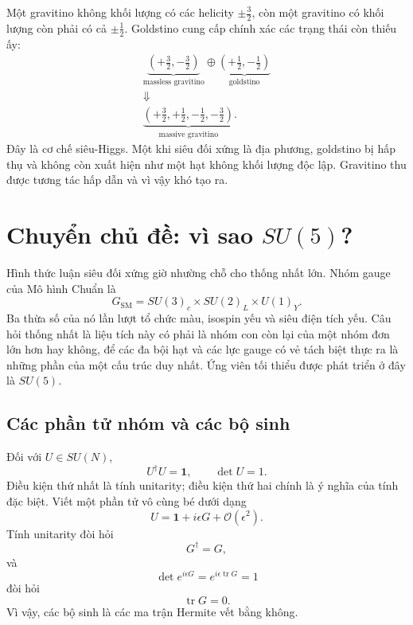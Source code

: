 Một gravitino không khối lượng có các helicity \(\pm\tfrac32\), còn một gravitino có khối lượng còn phải có cả \(\pm\tfrac12\). Goldstino cung cấp chính xác các trạng thái còn thiếu ấy:
\begin{equation}
\begin{gathered}
\underbrace{\left(+\frac32,-\frac32\right)}_{\text{massless gravitino}}
\oplus
\underbrace{\left(+\frac12,-\frac12\right)}_{\text{goldstino}}\\
\Downarrow\\
\underbrace{\left(+\frac32,+\frac12,-\frac12,-\frac32\right)}_{\text{massive gravitino}}.
\end{gathered}
\label{eq:l9-super-higgs}
\end{equation}
Đây là cơ chế siêu-Higgs. Một khi siêu đối xứng là địa phương, goldstino bị hấp thụ và không còn xuất hiện như một hạt không khối lượng độc lập. Gravitino thu được tương tác hấp dẫn và vì vậy khó tạo ra.

\section{Chuyển chủ đề: vì sao \texorpdfstring{\(SU(5)\)}{SU(5)}?}

Hình thức luận siêu đối xứng giờ nhường chỗ cho thống nhất lớn. Nhóm gauge của Mô hình Chuẩn là
\begin{equation}
G_{\mathrm{SM}}
=SU(3)_c\times SU(2)_L\times U(1)_Y.
\label{eq:l9-sm-group}
\end{equation}
Ba thừa số của nó lần lượt tổ chức màu, isospin yếu và siêu điện tích yếu. Câu hỏi thống nhất là liệu tích này có phải là nhóm con còn lại của một nhóm đơn lớn hơn hay không, để các đa bội hạt và các lực gauge có vẻ tách biệt thực ra là những phần của một cấu trúc duy nhất. Ứng viên tối thiểu được phát triển ở đây là \(SU(5)\).

\subsection{Các phần tử nhóm và các bộ sinh}

Đối với \(U\in SU(N)\),
\begin{equation}
U^\dagger U=\mathbf1,
\qquad
\det U=1.
\label{eq:l9-SUN-def}
\end{equation}
Điều kiện thứ nhất là tính unitarity; điều kiện thứ hai chính là ý nghĩa của tính đặc biệt. Viết một phần tử vô cùng bé dưới dạng
\begin{equation}
U=\mathbf1+i\epsilon G+\mathcal O(\epsilon^2).
\label{eq:l9-infinitesimal-U}
\end{equation}
Tính unitarity đòi hỏi
\begin{equation}
G^\dagger=G,
\end{equation}
và
\begin{equation}
\det e^{i\epsilon G}
=e^{i\epsilon\operatorname{tr}G}=1
\end{equation}
đòi hỏi
\begin{equation}
\operatorname{tr}G=0.
\end{equation}
Vì vậy, các bộ sinh là các ma trận Hermite vết bằng không.

